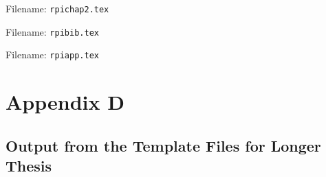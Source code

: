\documentclass[letterpaper,11pt]{article}
\begin{document}
Filename: \verb|rpichap2.tex|



Filename: \verb|rpibib.tex|



Filename: \verb|rpiapp.tex|



\newpage

\vspace*{3in}

\section*{Appendix D}
\label{sec:appD}

\subsection*{Output from the Template Files for Longer Thesis}


\end{document}
